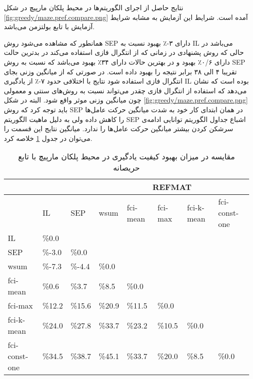  نتایج حاصل از اجرای الگوریتم‌ها در محیط پلکان مارپیچ در شکل
\ref{fig:greedy/maze.pref.compare.png}
آمده است. شرایط این آزمایش به مشابه شرایط آزمایش با تابع بولتزمن می‌باشد.


همانطور که مشاهده می‌شود روش SEP دارای ۳-٪ بهبود نسبت به IL می‌باشد در حالی که روش پشنهادی در زمانی که از انتگرال فازی استفاده می‌کند در بدترین حالت دارای ۰/۶٪ بهبود و در بهترین حالات دارای ۳۴٪ بهبود می‌باشد که نسبت به روش SEP تقریبا ۴ الی ۳۸ برابر نتیجه را بهبود داده است. در صورتی که از میانگین وزنی بجای انتگرال فازی استفاده شود نتایج با اختلافی حدود ۷-٪  از یادگیری IL بوده است که نشان ‌می‌دهد که استفاده از انتگرال فازی چقدر می‌تواند نسبت به روش‌های سنتی و معمولی چون میانگین وزنی موثر واقع شود. البته در شکل \ref{fig:greedy/maze.pref.compare.png} باید توجه کرد که روش SEP در همان ابتدای کار خود به شدت میانگین حرکت عامل‌ها را کاهش داده ولی به دلیل ماهیت الگوریتم SEP اشباع جداول الگوریتم توانایی ادامه‌ی سرشکن کردن بیشتر میانگین حرکت عامل‌ها را ندارد. میانگین نتایج این قسمت را می‌توان در جدول
\ref{tab:maze_pref_compare_greedy}
خلاصه کرد.

\begin{table}
\centering
\caption{مقایسه در میزان بهبود کیفیت یادگیری در محیط پلکان مارپیچ با تابع حریصانه}\label{tab:maze_pref_compare_greedy}
\begin{latin}
\begin{tabular}{|*8{l|}}
\hline
\multicolumn{3}{|c|}{}& \multicolumn{5}{c|}{REFMAT}
\\\hline
& IL & SEP & wsum & fci-mean & fci-max & fci-k-mean & fci-const-one  
\\\hline
IL & \%0.0 & & & & & &  
\\\hline
SEP & \%-3.0 & \%0.0 & & & & &  
\\\hline
wsum & \%-7.3 & \%-4.4 & \%0.0 & & & &  
\\\hline
fci-mean & \%0.6 & \%3.7 & \%8.5 & \%0.0 & & &  
\\\hline
fci-max & \%12.2 & \%15.6 & \%20.9 & \%11.5 & \%0.0 & &  
\\\hline
fci-k-mean & \%24.0 & \%27.8 & \%33.7 & \%23.2 & \%10.5 & \%0.0 &  
\\\hline
fci-const-one & \%34.5 & \%38.7 & \%45.1 & \%33.7 & \%20.0 & \%8.5 & \%0.0  
\\\hline
\end{tabular}
\end{latin}
\end{table}

